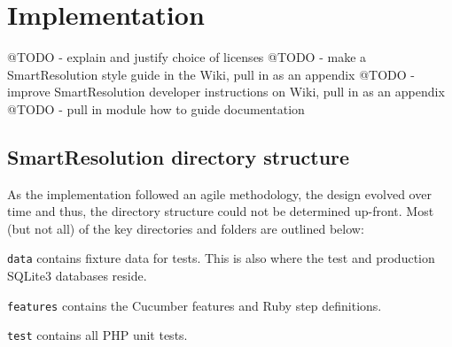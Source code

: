 \chapter{Implementation} %

@TODO - explain and justify choice of licenses
@TODO - make a SmartResolution style guide in the Wiki, pull in as an appendix
@TODO - improve SmartResolution developer instructions on Wiki, pull in as an appendix
@TODO - pull in module how to guide documentation

\section{SmartResolution directory structure}

As the implementation followed an agile methodology, the design evolved over time and thus, the directory structure could not be determined up-front. Most (but not all) of the key directories and folders are outlined below:

\begin{samepage}
\end{samepage}

\lstinline{data} contains fixture data for tests. This is also where the test and production SQLite3 databases reside.

\lstinline{features} contains the Cucumber features and Ruby step definitions.

\lstinline{test} contains all PHP unit tests.


